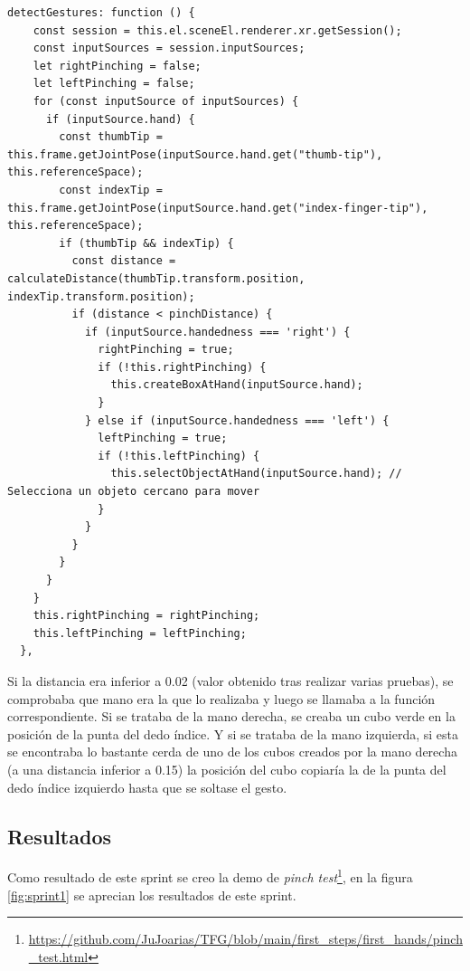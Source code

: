 \documentclass[a4paper, 12pt]{book}
\begin{document}
\begin{lstlisting}[caption=Función detectGestures, captionpos=b, label=lst:firstdetectGesture]
  detectGestures: function () {
    const session = this.el.sceneEl.renderer.xr.getSession();
    const inputSources = session.inputSources;
    let rightPinching = false;
    let leftPinching = false;
    for (const inputSource of inputSources) {
      if (inputSource.hand) {
        const thumbTip = this.frame.getJointPose(inputSource.hand.get("thumb-tip"), this.referenceSpace);
        const indexTip = this.frame.getJointPose(inputSource.hand.get("index-finger-tip"), this.referenceSpace);
        if (thumbTip && indexTip) {
          const distance = calculateDistance(thumbTip.transform.position, indexTip.transform.position);
          if (distance < pinchDistance) {
            if (inputSource.handedness === 'right') {
              rightPinching = true;
              if (!this.rightPinching) {
                this.createBoxAtHand(inputSource.hand);  
              }
            } else if (inputSource.handedness === 'left') {
              leftPinching = true;
              if (!this.leftPinching) {
                this.selectObjectAtHand(inputSource.hand); // Selecciona un objeto cercano para mover
              }
            }
          }
        }
      }
    }
    this.rightPinching = rightPinching;
    this.leftPinching = leftPinching;
  },
\end{lstlisting}

Si la distancia era inferior a 0.02 (valor obtenido tras realizar varias pruebas), se comprobaba que mano era la que lo realizaba y luego se llamaba a la función correspondiente. 
Si se trataba de la mano derecha, se creaba un cubo verde en la posición de la punta del dedo índice. Y si se trataba de la mano izquierda, si esta se encontraba lo bastante cerda de uno de los cubos creados por la mano derecha (a una distancia inferior a 0.15) la posición del cubo copiaría la de la punta del dedo índice izquierdo hasta que se soltase el gesto.


\subsection{Resultados}
\label{subsec:resultados1}

Como resultado de este sprint se creo la demo de \textit{pinch test}\footnote{\url{https://github.com/JuJoarias/TFG/blob/main/first_steps/first_hands/pinch_test.html}}, en la figura \ref{fig:sprint1} se aprecian los resultados de este sprint.
\end{document}
